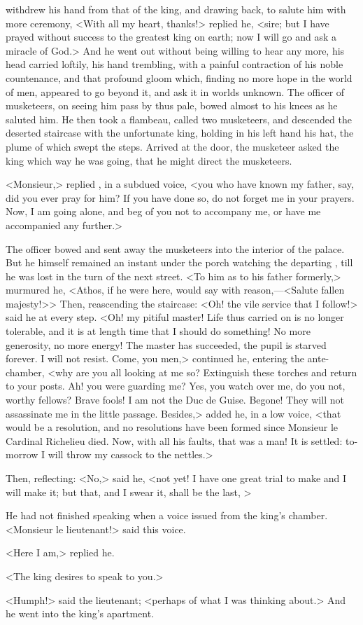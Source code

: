  withdrew his hand from that of the king, and drawing back, to salute him with more ceremony, <With all my heart, thanks!> replied he, <sire; but I have prayed without success to the greatest king on earth; now I will go and ask a miracle of God.> And he went out without being willing to hear any more, his head carried loftily, his hand trembling, with a painful contraction of his noble countenance, and that profound gloom which, finding no more hope in the world of men, appeared to go beyond it, and ask it in worlds unknown. The officer of musketeers, on seeing him pass by thus pale, bowed almost to his knees as he saluted him. He then took a flambeau, called two musketeers, and descended the deserted staircase with the unfortunate king, holding in his left hand his hat, the plume of which swept the steps. Arrived at the door, the musketeer asked the king which way he was going, that he might direct the musketeers.

<Monsieur,> replied , in a subdued voice, <you who have known my father, say, did you ever pray for him? If you have done so, do not forget me in your prayers. Now, I am going alone, and beg of you not to accompany me, or have me accompanied any further.>

The officer bowed and sent away the musketeers into the interior of the palace. But he himself remained an instant under the porch watching the departing , till he was lost in the turn of the next street. <To him as to his father formerly,> murmured he, <Athos, if he were here, would say with reason,—<Salute fallen majesty!>> Then, reascending the staircase: <Oh! the vile service that I follow!> said he at every step. <Oh! my pitiful master! Life thus carried on is no longer tolerable, and it is at length time that I should do something! No more generosity, no more energy! The master has succeeded, the pupil is starved forever.  I will not resist. Come, you men,> continued he, entering the ante-chamber, <why are you all looking at me so? Extinguish these torches and return to your posts. Ah! you were guarding me? Yes, you watch over me, do you not, worthy fellows? Brave fools! I am not the Duc de Guise. Begone! They will not assassinate me in the little passage. Besides,> added he, in a low voice, <that would be a resolution, and no resolutions have been formed since Monsieur le Cardinal Richelieu died. Now, with all his faults, that was a man! It is settled: to-morrow I will throw my cassock to the nettles.>

Then, reflecting: <No,> said he, <not yet! I have one great trial to make and I will make it; but that, and I swear it, shall be the last, >

He had not finished speaking when a voice issued from the king's chamber. <Monsieur le lieutenant!> said this voice.

<Here I am,> replied he.

<The king desires to speak to you.>

<Humph!> said the lieutenant; <perhaps of what I was thinking about.> And he went into the king's apartment. 